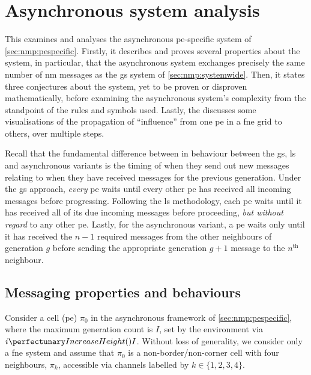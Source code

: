 \section{\label{sec:nmp:analysis}Asynchronous system analysis}

This  examines and analyses the asynchronous \gls{pe}-specific system of \cref{sec:nmp:pespecific}.  Firstly, it describes and proves several properties about the system, in particular, that the asynchronous system exchanges precisely the same number of \gls{nm} messages as the \gls{gs} system of \cref{sec:nmp:systemwide}.  Then, it states three conjectures about the system, yet to be proven or disproven mathematically, before examining the asynchronous system's complexity from the standpoint of the rules and symbols used.  Lastly, the  discusses some visualisations of the propagation of ``influence'' from one \gls{pe} in a \gls{fne} grid to others, over multiple steps.

Recall that the fundamental difference between in behaviour between the \gls{gs}, \gls{ls} and asynchronous variants is the timing of when they send out new messages relating to when they have received messages for the previous generation.  Under the \gls{gs} approach, \emph{every} \gls{pe} waits until every other \gls{pe} has received all incoming messages before progressing.  Following the \gls{ls} methodology, each \gls{pe} waits until it has received all of its due incoming messages before proceeding, \emph{but without regard} to any other \gls{pe}.  Lastly, for the asynchronous variant, a \gls{pe} waits only until it has received the \(n - 1\) required messages from the other neighbours of generation \(g\) before sending the appropriate generation \(g + 1\) message to the \(n^\text{th}\) neighbour.

\subsection{\label{sec:nmp:msgprops}Messaging properties and behaviours}

Consider a cell (\gls{pe}) $\pi_0$ in the asynchronous framework of \cref{sec:nmp:pespecific},
where the maximum generation count is $I$, set by the environment via $\cpfunc{i}{I}$.
Without loss of generality, 
we consider only a \gls{fne} system and
assume that $\pi_0$ is a non-border/non-corner cell with four neighbours, 
$\pi_k$, accessible via channels labelled by $k \in \{ 1, 2, 3, 4 \}$. 

